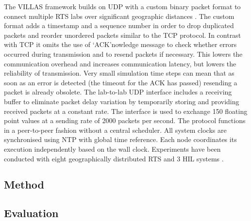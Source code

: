 \documentclass[a4paper,ngerman]{atseminar}
\begin{document}
The VILLAS framework builds on UDP with a custom binary packet format to connect multiple RTS labs over significant geographic distances \cite{stevic2017, monti2018, vogel2019}. The custom format adds a timestamp and a sequence number in order to drop duplicated packets and reorder unordered packets similar to the TCP protocol. In contrast with TCP it omits the use of `ACK'nowledge message to check whether errors occurred during transmission and to resend packets if necessary. This lowers the
communication overhead and increases communication latency, but lowers the reliability of transmission. Very small simulation time steps can mean that as soon as an error is detected (the timeout for the ACK has passed) resending a packet is already obsolete. The lab-to-lab UDP interface includes a receiving buffer to eliminate packet delay variation \cite{rfc3393} by temporarily storing and providing received packets at a constant rate. The interface is used to exchange 150 floating point
values at a sending rate of 2000 packets per second. The protocol functions in a peer-to-peer fashion without a central scheduler. 
All system clocks are synchronised using NTP with global time reference. Each node coordinates its execution independently based on the wall clock. Experiments have been conducted with eight geographically distributed RTS and 3 HIL systems \cite{monti2018}.


\subsection{Method}


\subsection{Evaluation}


\begin{table}[h]
\centering
\caption{Comparison of solutions to GD-RTS of power systems}
\end{table}
\end{document}
